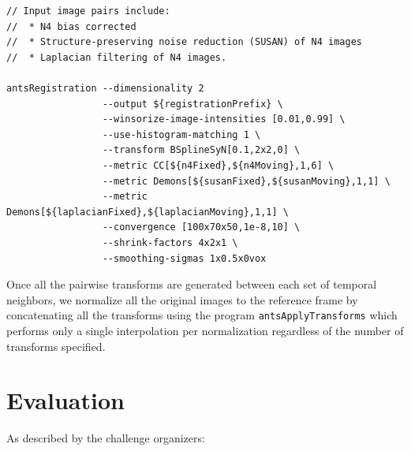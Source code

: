 \documentclass{llncs}
\begin{document}
\begin{lstlisting}
// Input image pairs include:
//  * N4 bias corrected
//  * Structure-preserving noise reduction (SUSAN) of N4 images
//  * Laplacian filtering of N4 images.

antsRegistration --dimensionality 2 
                 --output ${registrationPrefix} \
                 --winsorize-image-intensities [0.01,0.99] \
                 --use-histogram-matching 1 \
                 --transform BSplineSyN[0.1,2x2,0] \
                 --metric CC[${n4Fixed},${n4Moving},1,6] \
                 --metric Demons[${susanFixed},${susanMoving},1,1] \
                 --metric Demons[${laplacianFixed},${laplacianMoving},1,1] \
                 --convergence [100x70x50,1e-8,10] \
                 --shrink-factors 4x2x1 \
                 --smoothing-sigmas 1x0.5x0vox
\end{lstlisting}

Once all the pairwise transforms are generated between each set of temporal 
neighbors, we normalize all the original images to the reference frame
by concatenating all the transforms using the program {\tt antsApplyTransforms}
which performs only a single interpolation per normalization regardless of
the number of transforms specified.

\section{Evaluation}

As described by the challenge organizers:
\end{document}
